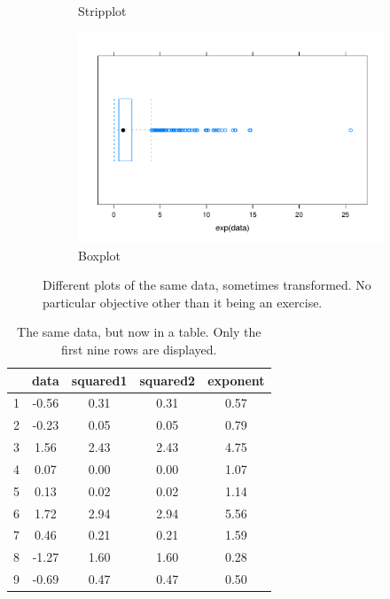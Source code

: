 \documentclass{article}
\begin{document}
\begin{figure}[h]
\begin{subfigure}{.48\textwidth}
        \caption{Stripplot}
        \label{fig:strip}
    \end{subfigure}
    \begin{subfigure}{.48\textwidth}
        \includegraphics[width=\textwidth]{w1_boxplot.pdf}
        \caption{Boxplot}
        \label{fig:box}
    \end{subfigure}
    \caption{Different plots of the same data, sometimes transformed. No particular objective other than it being an exercise.}
\end{figure}

\begin{table}[!htb]
    \centering
    \caption{The same data, but now in a table. Only the first nine rows are displayed.}
    \begin{tabular}{c c c c c}
    \hline
    & data & squared1 & squared2 & exponent \\
    \hline
    1 & -0.56 & 0.31 & 0.31 & 0.57 \\
    2 & -0.23 & 0.05 & 0.05 & 0.79 \\
    3 & 1.56  & 2.43 & 2.43 & 4.75 \\
    4 & 0.07  & 0.00 & 0.00 & 1.07 \\
    5 & 0.13  & 0.02 & 0.02 & 1.14 \\
    6 & 1.72  & 2.94 & 2.94 & 5.56 \\
    7 & 0.46  & 0.21 & 0.21 & 1.59 \\
    8 & -1.27 & 1.60 & 1.60 & 0.28 \\
    9 & -0.69 & 0.47 & 0.47 & 0.50 \\
    \hline
    \end{tabular}
    \label{tab:my_label}
\end{table}
\end{document}
